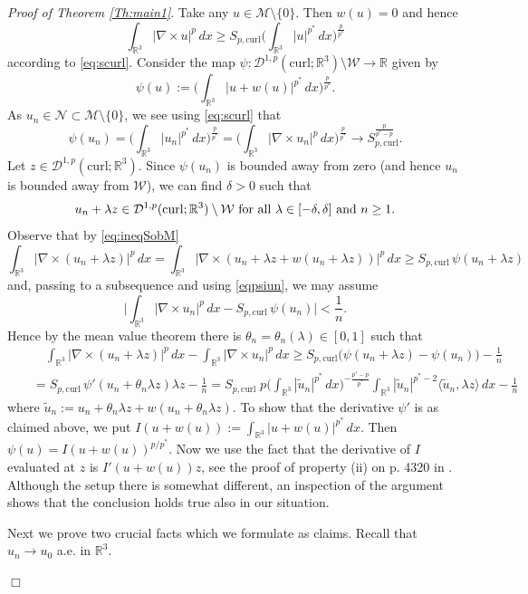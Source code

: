\documentclass[12pt,leqno,twoside]{amsart}
\newenvironment{altproof}[1]
{\noindent%
{\em Proof of {#1}}.}
{\nopagebreak\mbox{}\hfill $\Box$\par\addvspace{0.5cm}}
\newcommand{\wt}{\widetilde}
\def\R{\mathbb{R}}
\def\curl{\mathrm{curl}}
\def\Wc{\mathscr{W}}
\newcommand{\cD}{{\mathcal D}}
\newcommand{\cM}{{\mathcal M}}
\newcommand{\cN}{{\mathcal N}}
\newcommand{\cW}{{\mathcal W}}
\def\r{\mathbb{R}}
\def\r3{\mathbb{R}^3}
\def\Wc{\cD^{1,p}(\curl;\R^3)}
\def\ir3{\int_{\r3}}
\def\wt{\widetilde}
\def\cm{\mathcal{M}}
\def\curlop{\nabla\times}
\numberwithin{equation}{section}
\begin{document}
\begin{altproof}{Theorem \ref{Th:main1}}
Take any $u\in \cM\setminus\{0\}$. Then $w(u)=0$
and hence
\begin{equation}\label{eq:ineqSobM}
\int_{\R^3}|\curlop u|^p\,dx\geq S_{p,\curl}\Big(\int_{\R^3}|u|^{p^*}\,dx\Big)^{\frac{p}{p^*}}
\end{equation}
according to \eqref{eq:scurl}.
Consider the map $\psi:\Wc\setminus\cW\to\R$ given by 
$$\psi(u):=\Big(\int_{\R^3}|u+w(u)|^{p^*}\,dx\Big)^{\frac{p}{p^*}}.$$
As $u_n\in\cN\subset\cm\setminus\{0\}$, we see using \eqref{eq:scurl} that
\begin{equation}\label{eqpsiun}
\psi(u_n)=\Big(\int_{\R^3}|u_n|^{p^*}\,dx\Big)^{\frac{p}{p^*}}=\Big(\int_{\R^3}|\curlop u_n|^{p}\,dx\Big)^{\frac{p}{p^*}}\to S_{p,\curl}^{\frac{p}{p^*-p}}.
\end{equation}
Let $z\in \Wc$.
Since $\psi(u_n)$ is bounded away from zero (and hence $u_n$ is bounded away from $\cW$), we can find $\delta>0$ such that
$$u_n+\lambda z\in \Wc\setminus\cW \hbox{ for all }\lambda\in [-\delta,\delta]\hbox{ and }n\geq 1.$$
Observe that by \eqref{eq:ineqSobM}
$$
\int_{\R^3}|\curlop (u_n+\lambda z)|^p\,dx =\int_{\R^3}|\curlop (u_n+\lambda z+w(u_n+\lambda z))|^p\,dx\geq S_{p,\curl}\, \psi(u_n+\lambda z)
$$
and, passing to a subsequence and using \eqref{eqpsiun}, we may assume
$$\Big|\int_{\R^3}|\curlop u_n|^p\,dx-S_{p,\curl}\,\psi(u_n)\Big|<\frac1n.$$
Hence by the mean value theorem there is $\theta_n=\theta_n(\lambda)\in [0,1]$ such that
\begin{eqnarray}\label{eq:firstspcurl}
&&\quad\int_{\R^3}|\curlop (u_n+\lambda z)|^p\,dx-\int_{\R^3}|\curlop u_n|^p\,dx \geq 
S_{p,\curl} \big(\psi(u_n+\lambda z)-\psi(u_n)\big)-\frac{1}{ n}\\ \nonumber
&& = S_{p,\curl}\,\psi'(u_n+\theta_n\lambda z)\lambda z-\frac1n = S_{p,\curl} \; p\Big(\int_{\R^3}|\wt u_n|^{p^*}\,dx\Big)^{-\frac{p^*-p}{p^*}}\int_{\R^3}|\wt u_n|^{p^*-2}\langle \wt u_n, \lambda z\rangle \,dx-\frac{1}{n}
\end{eqnarray}
where $\wt u_n:=u_n+\theta_n\lambda z+w(u_n+\theta_n\lambda z)$. To show that the derivative $\psi'$ is as claimed above, we put $I(u+w(u)) := \ir3|u+w(u)|^{p^*}\,dx$. Then $\psi(u) = I(u+w(u))^{p/p^*}$. Now we use the fact that the derivative of $I$ evaluated at $z$ is $I'(u+w(u))z$, see the proof of property (ii) on p. 4320 in \cite{BartschMederski2}. Although the setup there is somewhat different, an inspection of the argument shows that the conclusion holds true also in our situation. 

Next we prove two crucial facts which we formulate as claims. Recall that $u_n\to u_0$ a.e. in $\r3$.


\end{altproof}
\end{document}
